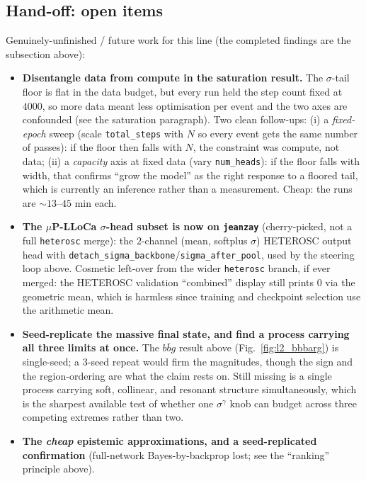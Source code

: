 \documentclass[11pt]{article}
\newcommand{\code}[1]{\texttt{#1}}
\begin{document}
\subsection{Hand-off: open items}\label{sec:div-open}
Genuinely-unfinished / future work for this line (the completed findings are the subsection above):
\begin{itemize}
  \item \textbf{Disentangle data from compute in the saturation result.} The $\sigma$-tail floor is flat
    in the data budget, but every run held the step count fixed at $4000$, so more data meant less
    optimisation per event and the two axes are confounded (see the saturation paragraph). Two clean
    follow-ups: (i) a \emph{fixed-epoch} sweep (scale \code{total\_steps} with $N$ so every event gets the
    same number of passes): if the floor then falls with $N$, the constraint was compute, not data;
    (ii) a \emph{capacity} axis at fixed data (vary \code{num\_heads}): if the floor falls with width,
    that confirms ``grow the model'' as the right response to a floored tail, which is currently an
    inference rather than a measurement. Cheap: the runs are ${\sim}13$--$45$ min each.
  \item \textbf{The $\mu$P-LLoCa $\sigma$-head subset is now on \code{jeanzay}} (cherry-picked, not a
    full \code{heterosc} merge): the $2$-channel (mean, softplus $\sigma$) HETEROSC output head with
    \code{detach\_sigma\_backbone}/\code{sigma\_after\_pool}, used by the steering loop above. Cosmetic
    left-over from the wider \code{heterosc} branch, if ever merged: the HETEROSC validation
    ``combined'' display still prints $0$ via the geometric mean, which is harmless since training and
    checkpoint selection use the arithmetic mean.
  \item \textbf{Seed-replicate the massive final state, and find a process carrying all three
    limits at once.} The $b\bar b g$ result above (Fig.~\ref{fig:l2_bbbarg}) is single-seed; a
    $3$-seed repeat would firm the magnitudes, though the sign and the region-ordering are what the
    claim rests on. Still missing is a single process carrying soft, collinear, and resonant
    structure simultaneously, which is the sharpest available test of whether one $\sigma^\gamma$
    knob can budget across three competing extremes rather than two.
  \item \textbf{The \emph{cheap} epistemic approximations, and a seed-replicated confirmation}
    (full-network Bayes-by-backprop lost; see the ``ranking'' principle above).

\end{itemize}
\end{document}
